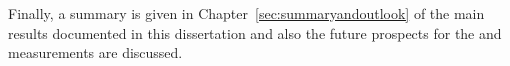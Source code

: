 Finally, a summary is given in Chapter~\ref{sec:summaryandoutlook} of the main results documented in this dissertation and also the future prospects for the \BF and \el measurements are discussed. 

